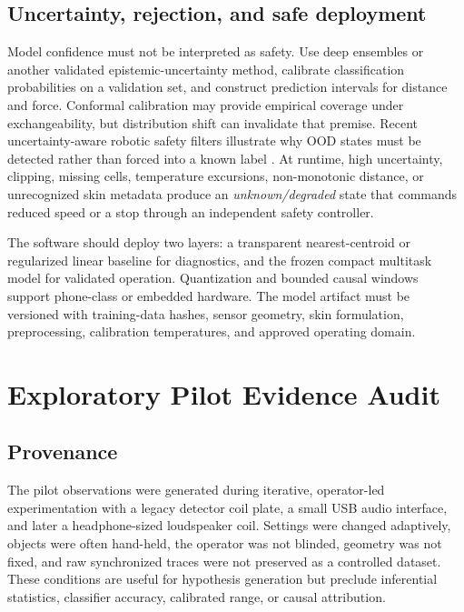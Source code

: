 \documentclass[10pt]{article}
\begin{document}
\subsection{Uncertainty, rejection, and safe deployment}
Model confidence must not be interpreted as safety. Use deep ensembles or another validated epistemic-uncertainty method, calibrate classification probabilities on a validation set, and construct prediction intervals for distance and force. Conformal calibration may provide empirical coverage under exchangeability, but distribution shift can invalidate that premise. Recent uncertainty-aware robotic safety filters illustrate why OOD states must be detected rather than forced into a known label \citep{seo2025unisafe}. At runtime, high uncertainty, clipping, missing cells, temperature excursions, non-monotonic distance, or unrecognized skin metadata produce an \emph{unknown/degraded} state that commands reduced speed or a stop through an independent safety controller.

The software should deploy two layers: a transparent nearest-centroid or regularized linear baseline for diagnostics, and the frozen compact multitask model for validated operation. Quantization and bounded causal windows support phone-class or embedded hardware. The model artifact must be versioned with training-data hashes, sensor geometry, skin formulation, preprocessing, calibration temperatures, and approved operating domain.

\section{Exploratory Pilot Evidence Audit}
\label{sec:pilot}
\subsection{Provenance}
The pilot observations were generated during iterative, operator-led experimentation with a legacy detector coil plate, a small USB audio interface, and later a headphone-sized loudspeaker coil. Settings were changed adaptively, objects were often hand-held, the operator was not blinded, geometry was not fixed, and raw synchronized traces were not preserved as a controlled dataset. These conditions are useful for hypothesis generation but preclude inferential statistics, classifier accuracy, calibrated range, or causal attribution.
\end{document}
